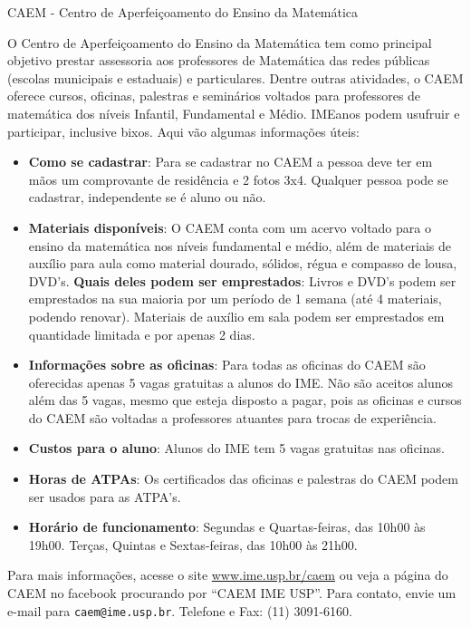 \begin{secao}{CAEM - Centro de Aperfeiçoamento do Ensino da Matemática}

O Centro de Aperfeiçoamento do Ensino da Matemática tem como principal
objetivo prestar assessoria aos professores de Matemática das redes
públicas (escolas municipais e estaduais) e particulares. Dentre
outras atividades, o CAEM oferece cursos, oficinas, palestras e
seminários voltados para professores de matemática dos níveis
Infantil, Fundamental e Médio. IMEanos podem usufruir e participar,
inclusive bixos. Aqui vão algumas informações úteis:


\begin{itemize}

\item \textbf{Como se cadastrar}: Para se cadastrar no CAEM a pessoa
  deve ter em mãos um comprovante de residência e 2 fotos
  3x4. Qualquer pessoa pode se cadastrar, independente se é aluno ou
  não.

\item \textbf{Materiais disponíveis}: O CAEM conta com um acervo
  voltado para o ensino da matemática nos níveis fundamental e médio,
  além de materiais de auxílio para aula como material dourado,
  sólidos, régua e compasso de lousa, DVD's. \textbf{Quais deles podem
    ser emprestados}: Livros e DVD's podem ser emprestados na sua
  maioria por um período de 1 semana (até 4 materiais, podendo
  renovar). Materiais de auxílio em sala podem ser emprestados em
  quantidade limitada e por apenas 2 dias.

\item \textbf{Informações sobre as oficinas}: Para todas as oficinas
  do CAEM são oferecidas apenas 5 vagas gratuitas a alunos do IME. Não
  são aceitos alunos além das 5 vagas, mesmo que esteja disposto a
  pagar, pois as oficinas e cursos do CAEM são voltadas a professores
  atuantes para trocas de experiência.

\item \textbf{Custos para o aluno}: Alunos do IME tem 5 vagas
  gratuitas nas oficinas.

\item \textbf{Horas de ATPAs}: Os certificados das oficinas e palestras
 do CAEM podem ser usados para as ATPA's.

\item \textbf{Horário de funcionamento}: Segundas e Quartas-feiras,
  das 10h00 às 19h00. Terças, Quintas e Sextas-feiras, das 10h00 às
  21h00.
\end{itemize}

Para mais informações, acesse o site \url{www.ime.usp.br/caem} ou veja
a página do CAEM no facebook procurando por ``CAEM IME USP''. Para
contato, envie um e-mail para {\tt caem@ime.usp.br}. Telefone e Fax:
(11) 3091-6160.


\end{secao}
